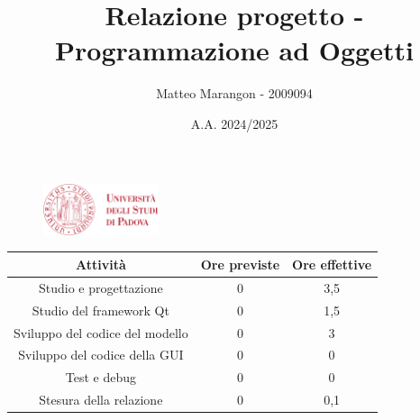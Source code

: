 \documentclass[10pt]{article}
\title{Relazione progetto - Programmazione ad Oggetti}
\author{Matteo Marangon - 2009094}
\date{A.A. 2024/2025}
\begin{document}
\begin{figure}
    \centering
    \includegraphics[width=0.3\textwidth]{./unipdlogo.png}
\end{figure}
\maketitle

\newpage

\tableofcontents
\newpage

\begin{center}
    \begin{tabular}{| c | c | c |} \hline
    Attività & Ore previste & Ore effettive \\\hline
    Studio e progettazione & 0 & 3,5 \\
    Studio del framework Qt & 0 & 1,5 \\
    Sviluppo del codice del modello & 0 & 3 \\
    Sviluppo del codice della GUI & 0 & 0 \\
    Test e debug & 0 & 0 \\
    Stesura della relazione & 0 & 0,1 \\\hline
    \end{tabular}
\end{center}
\end{document}
